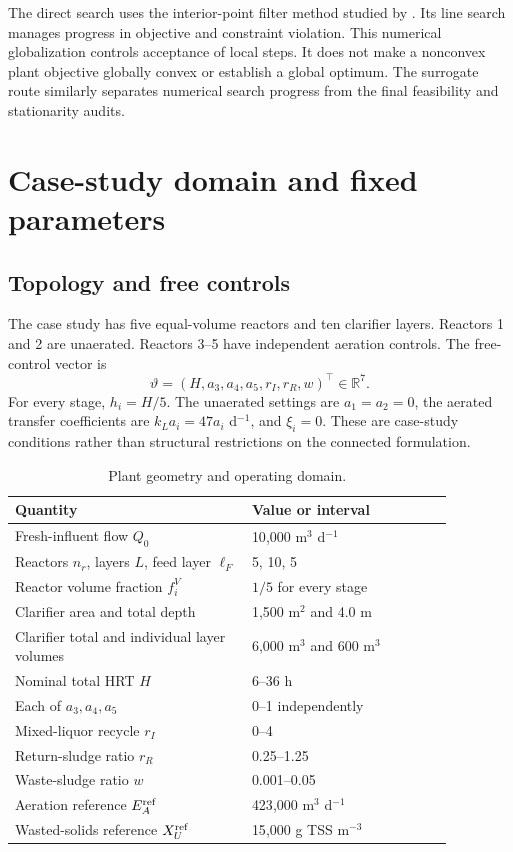 The direct search uses the interior-point filter method studied by \citet{WachterBiegler2006}. Its line search manages progress in objective and constraint violation. This numerical globalization controls acceptance of local steps. It does not make a nonconvex plant objective globally convex or establish a global optimum. The surrogate route similarly separates numerical search progress from the final feasibility and stationarity audits.

\section{Case-study domain and fixed parameters}

\subsection{Topology and free controls}

The case study has five equal-volume reactors and ten clarifier layers. Reactors 1 and 2 are unaerated. Reactors 3--5 have independent aeration controls. The free-control vector is
\begin{equation}
\vartheta=(H,a_3,a_4,a_5,r_I,r_R,w)^\top\in\mathbb R^7.
\label{eq:plant_case_controls}
\end{equation}
For every stage, $h_i=H/5$. The unaerated settings are $a_1=a_2=0$, the aerated transfer coefficients are $k_La_i=47a_i$ d$^{-1}$, and $\xi_i=0$. These are case-study conditions rather than structural restrictions on the connected formulation.

\begin{table}[htbp]
\centering\small
\caption{Plant geometry and operating domain.}
\label{tab:plant_operating_domain}
\begin{tabular}{p{0.47\linewidth}p{0.40\linewidth}}
\toprule
Quantity & Value or interval\\
\midrule
Fresh-influent flow $Q_0$ & 10{,}000 m$^3$ d$^{-1}$\\
Reactors $n_r$, layers $L$, feed layer $\ell_F$ & 5, 10, 5\\
Reactor volume fraction $f_i^V$ & $1/5$ for every stage\\
Clarifier area and total depth & 1{,}500 m$^2$ and 4.0 m\\
Clarifier total and individual layer volumes & 6{,}000 m$^3$ and 600 m$^3$\\
Nominal total HRT $H$ & 6--36 h\\
Each of $a_3,a_4,a_5$ & 0--1 independently\\
Mixed-liquor recycle $r_I$ & 0--4\\
Return-sludge ratio $r_R$ & 0.25--1.25\\
Waste-sludge ratio $w$ & 0.001--0.05\\
Aeration reference $E_A^{\rm ref}$ & 423{,}000 m$^3$ d$^{-1}$\\
Wasted-solids reference $X_U^{\rm ref}$ & 15{,}000 g TSS m$^{-3}$\\
\bottomrule
\end{tabular}
\end{table}

